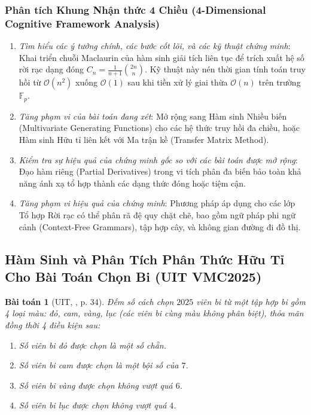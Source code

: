 \documentclass{article}
\newtheorem{baitoan}{Bài toán}
\begin{document}
\subsubsection*{Phân tích Khung Nhận thức 4 Chiều (4-Dimensional Cognitive Framework Analysis)}
\begin{enumerate}
 \item \textit{Tìm hiểu các ý tưởng chính, các bước cốt lõi, và các kỹ thuật chứng minh}: Khai triển chuỗi Maclaurin của hàm sinh giải tích liên tục để trích xuất hệ số rời rạc dạng đóng $C_n = \frac{1}{n+1}\binom{2n}{n}$. Kỹ thuật này nén thời gian tính toán truy hồi từ $\mathcal{O}(n^2)$ xuống $\mathcal{O}(1)$ sau khi tiền xử lý giai thừa $\mathcal{O}(n)$ trên trường $\mathbb{F}_p$.
 \item \textit{Tăng phạm vi của bài toán đang xét}: Mở rộng sang Hàm sinh Nhiều biến (Multivariate Generating Functions) cho các hệ thức truy hồi đa chiều, hoặc Hàm sinh Hữu tỉ liên kết với Ma trận kề (Transfer Matrix Method).
 \item \textit{Kiểm tra sự hiệu quả của chứng minh gốc so với các bài toán được mở rộng}: Đạo hàm riêng (Partial Derivatives) trong vi tích phân đa biến bảo toàn khả năng ánh xạ tổ hợp thành các dạng thức đóng hoặc tiệm cận.
 \item \textit{Tăng phạm vi hiệu quả của chứng minh}: Phương pháp áp dụng cho các lớp Tổ hợp Rời rạc có thể phân rã đệ quy chặt chẽ, bao gồm ngữ pháp phi ngữ cảnh (Context-Free Grammars), tập hợp cây, và không gian đường đi đồ thị.
\end{enumerate}



\subsection{Hàm Sinh và Phân Tích Phân Thức Hữu Tỉ Cho Bài Toán Chọn Bi (UIT VMC2025)}

\begin{baitoan}[UIT, \cite{VMS_VMC2025}, p. 34]
Đếm số cách chọn $2025$ viên bi từ một tập hợp bi gồm 4 loại màu: đỏ, cam, vàng, lục (các viên bi cùng màu không phân biệt), thỏa mãn đồng thời 4 điều kiện sau:
\begin{enumerate}
    \item[(i)] Số viên bi đỏ được chọn là một số chẵn.
    \item[(ii)] Số viên bi cam được chọn là một bội số của $7$.
    \item[(iii)] Số viên bi vàng được chọn không vượt quá $6$.
    \item[(iv)] Số viên bi lục được chọn không vượt quá $4$.
\end{enumerate}
\end{baitoan}
\end{document}
